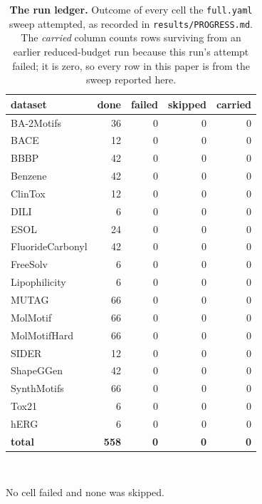 \begin{table}[t]
\centering
\caption{\textbf{The run ledger.} Outcome of every cell the \texttt{full.yaml} sweep attempted, as recorded in \texttt{results/PROGRESS.md}. The \emph{carried} column counts rows surviving from an earlier reduced-budget run because this run's attempt failed; it is zero, so every row in this paper is from the sweep reported here.}
\label{tab:ledger}
\footnotesize
\renewcommand{\arraystretch}{1.25}
\begin{tabular}{lrrrr}
\toprule
\textbf{dataset} & \textbf{done} & \textbf{failed} & \textbf{skipped} & \textbf{carried} \\
\midrule
BA-2Motifs & 36 & 0 & 0 & 0 \\
BACE & 12 & 0 & 0 & 0 \\
BBBP & 42 & 0 & 0 & 0 \\
Benzene & 42 & 0 & 0 & 0 \\
ClinTox & 12 & 0 & 0 & 0 \\
DILI & 6 & 0 & 0 & 0 \\
ESOL & 24 & 0 & 0 & 0 \\
FluorideCarbonyl & 42 & 0 & 0 & 0 \\
FreeSolv & 6 & 0 & 0 & 0 \\
Lipophilicity & 6 & 0 & 0 & 0 \\
MUTAG & 66 & 0 & 0 & 0 \\
MolMotif & 66 & 0 & 0 & 0 \\
MolMotifHard & 66 & 0 & 0 & 0 \\
SIDER & 12 & 0 & 0 & 0 \\
ShapeGGen & 42 & 0 & 0 & 0 \\
SynthMotifs & 66 & 0 & 0 & 0 \\
Tox21 & 6 & 0 & 0 & 0 \\
hERG & 6 & 0 & 0 & 0 \\
\midrule
\textbf{total} & \textbf{558} & \textbf{0} & \textbf{0} & \textbf{0} \\
\bottomrule
\end{tabular}
\\[4pt]\raggedright\footnotesize No cell failed and none was skipped.
\end{table}
